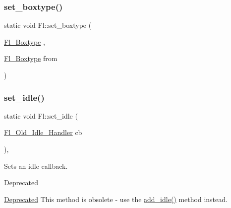 \subsubsection{\texorpdfstring{set\+\_\+boxtype()}{set\_boxtype()}\hspace{0.1cm}{\footnotesize\ttfamily [2/2]}}
{\footnotesize\ttfamily static void Fl\+::set\+\_\+boxtype (\begin{DoxyParamCaption}\item[{\hyperlink{_enumerations_8_h_ae48bf9070f8541de17829f54ccacc6bc}{Fl\+\_\+\+Boxtype}}]{,  }\item[{\hyperlink{_enumerations_8_h_ae48bf9070f8541de17829f54ccacc6bc}{Fl\+\_\+\+Boxtype}}]{from }\end{DoxyParamCaption})\hspace{0.3cm}{\ttfamily [static]}}

\mbox{\label{class_fl_a77955ad2f2b83fc5e3925b94e4533b20}} 
\subsubsection{\texorpdfstring{set\+\_\+idle()}{set\_idle()}}
{\footnotesize\ttfamily static void Fl\+::set\+\_\+idle (\begin{DoxyParamCaption}\item[{\hyperlink{group__callback__functions_ga238786923bf2e91732a7305fc0647dbf}{Fl\+\_\+\+Old\+\_\+\+Idle\+\_\+\+Handler}}]{cb }\end{DoxyParamCaption})\hspace{0.3cm}{\ttfamily [inline]}, {\ttfamily [static]}}

Sets an idle callback.

\begin{DoxyRefDesc}{Deprecated}
\item[\hyperlink{deprecated__deprecated000001}{Deprecated}]This method is obsolete -\/ use the \hyperlink{class_fl_a42d6e5121c18ed1a422fbb02993cf900}{add\+\_\+idle()} method instead. \end{DoxyRefDesc}
\mbox{\label{class_fl_adae20ff9b02d5c5017cdc0c8f1edb3eb}} 
